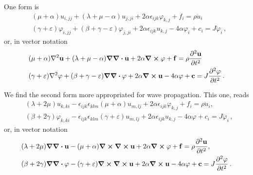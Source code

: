 \documentclass[12pt]{article}
\begin{document}
One form is
\begin{subequations}
  \begin{align}
    & (\mu + \alpha) u_{i, jj} + (\lambda + \mu - \alpha) u_{j,ji} + 2\alpha \epsilon_{ijk}\varphi_{k,j} + f_i = \rho \ddot{u}_i\, \\
    & (\gamma + \varepsilon) \varphi_{i, jj} + (\beta + \gamma - \varepsilon) \varphi_{j,ji} + 2\alpha \epsilon_{ijk}u_{k,j} - 4\alpha \varphi_i  + c_i = J \ddot{\varphi}_i\, ,
  \end{align}
\end{subequations}
or, in vector notation
\begin{align*}
    & (\mu + \alpha)\laplacian{\vb{u}} + (\lambda + \mu - \alpha) \grad\div\vb{u} + 2\alpha \curl\vb{\varphi} + \vb{f} = \rho \pdv[2]{\vb{u}}{t}\, \\
    & (\gamma + \varepsilon) \laplacian\vb{\varphi} + (\beta + \gamma - \varepsilon) \grad\div\vb{\varphi} + 2\alpha \curl\vb{u} - 4\alpha \vb{\varphi}  + \vb{c} = J \pdv[2]{\varphi}{t}\, .
\end{align*}

We find the second form more appropriated for wave propagation. This one, reads
\begin{subequations}
  \begin{align}
    & (\lambda + 2\mu) u_{k, ki} - \epsilon_{ijk} \epsilon_{klm} (\mu + \alpha) u_{m,lj}+ 2\alpha \epsilon_{ijk} \varphi_{k,j} + f_i = \rho \ddot{u}_i, \\
    & (\beta + 2\gamma) \varphi_{k, ki} - \epsilon_{ijk} \epsilon_{klm} (\gamma + \varepsilon) u_{m,lj}+ 2\alpha \epsilon_{ijk} u_{k,j} - 4\alpha\varphi + c_i = J \ddot{\varphi}_i\, ,
  \end{align}
\end{subequations}
or, in vector notation
\begin{subequations}\label{eq:disp_vector}
  \begin{align}
    & (\lambda + 2\mu) \grad\div\vb{u} - (\mu + \alpha)\curl\curl\vb{u} + 2\alpha \curl\vb{\varphi} + \vb{f} = \rho \pdv[2]{\vb{u}}{t}, \\
    & (\beta + 2\gamma) \grad\div\vb{\varphi} - (\gamma + \varepsilon) \curl\curl\vb{u} +  2\alpha \curl\vb{u} - 4\alpha\vb{\varphi} + \vb{c} = J \pdv[2]{\vb{\varphi}}{t}\, .
  \end{align}
\end{subequations}
\end{document}
